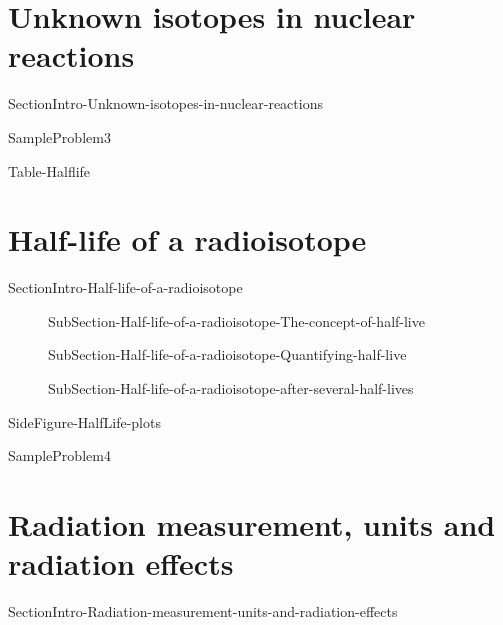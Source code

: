 \documentclass[main.tex]{subfiles}
\begin{document}
\section{Unknown isotopes in nuclear reactions}

{SectionIntro-Unknown-isotopes-in-nuclear-reactions}

  {SampleProblem3}

 


 
{Table-Halflife}


 

\section{Half-life of a radioisotope}
{SectionIntro-Half-life-of-a-radioisotope}



\sloppy \begin{description}

\item[]
{SubSection-Half-life-of-a-radioisotope-The-concept-of-half-live}

\item[]
{SubSection-Half-life-of-a-radioisotope-Quantifying-half-live}
\item[] 
{SubSection-Half-life-of-a-radioisotope-after-several-half-lives}






\end{description}



{SideFigure-HalfLife-plots}



  {SampleProblem4}





\section{Radiation measurement, units and radiation effects}
{SectionIntro-Radiation-measurement-units-and-radiation-effects}
 
\end{document}
